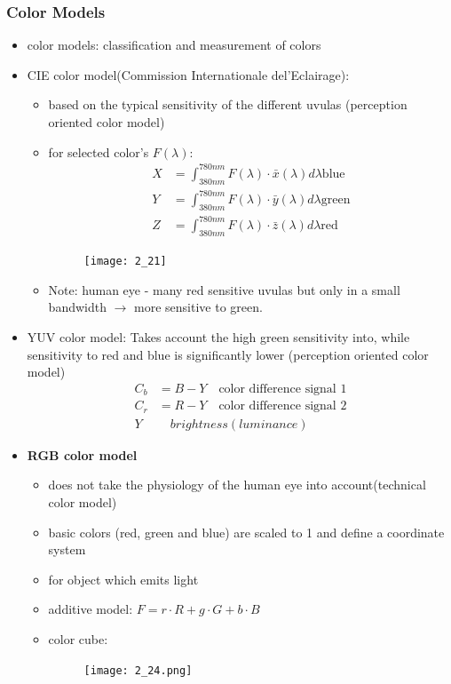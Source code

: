\documentclass{standalone}
\begin{document}
\subsubsection*{Color Models}
\begin{itemize}
		\item color models: classification and measurement of colors
		\item CIE color model(Commission Internationale del'Eclairage):
			\begin{itemize} 
				\item based on the typical sensitivity of the different uvulas (perception oriented color model)
				\item for selected color's $F(\lambda)$:
					\begin{align}
						X &= \int_{380nm}^{780nm} F(\lambda) \cdot \bar{x}(\lambda) d\lambda \text{blue}\\
						Y &= \int_{380nm}^{780nm} F(\lambda) \cdot \bar{y}(\lambda) d\lambda \text{green}\\
						Z &= \int_{380nm}^{780nm} F(\lambda) \cdot \bar{z}(\lambda) d\lambda \text{red}
					\end{align}
					
					\begin{figure}[H]
						\centering
						\texttt{[image: 2\_21]}
					\end{figure}
					
				\item Note: human eye - many red sensitive uvulas but only in a small bandwidth $\rightarrow$ more sensitive to green. 
			\end{itemize}
		\item YUV color model: Takes account the high green sensitivity into, while sensitivity to red and blue is significantly lower (perception oriented color model)
		\begin{align}
			C_b &= B - Y \quad \text{color difference signal 1}\\
			C_r &= R - Y \quad \text{color difference signal 2}\\
			Y & \quad brightness (luminance)
		\end{align}
		\item \textbf{RGB color model}
			\begin{itemize} 
				\item does not take the physiology of the human eye into account(technical color model)
				\item basic colors (red, green and blue) are scaled to 1 and define a coordinate system
				\item for object which emits light
				\item additive model: $F = r \cdot R + g \cdot G + b \cdot B$
				\item color cube:
					\begin{figure}[H]
						\centering
						\texttt{[image: 2\_24.png]}
					\end{figure}
			\end{itemize}


\end{itemize}
\end{document}
